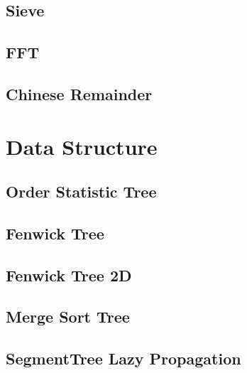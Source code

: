 \documentclass[10pt,landscape,a4paper,twocolumn]{article}
\begin{document}
\subsection{Sieve}




\subsection{FFT}


\subsection{Chinese Remainder}




\section{Data Structure}

\subsection{Order Statistic Tree}


\subsection{Fenwick Tree}


\subsection{Fenwick Tree 2D}


\subsection{Merge Sort Tree}


\subsection{SegmentTree Lazy Propagation}

\end{document}
